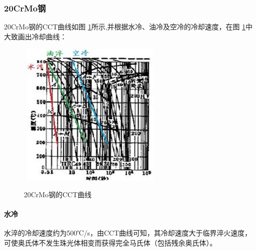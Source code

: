 \documentclass[12pt]{ctexart}
\begin{document}
\subsubsection{20CrMo钢}
20CrMo钢的CCT曲线如图 \ref{cct20}所示,并根据水冷、油冷及空冷的冷却速度，在图 \ref{cct20}中大致画出冷却曲线：
\begin{figure}[h]
  \centering
  \includegraphics[width=7cm,height=7cm]{cct20.jpg}\\
  \caption{20CrMo钢的CCT曲线}\label{cct20}
\end{figure}
\paragraph{水冷}
水淬的冷却速度约为500℃/s，由CCT曲线可知，其冷却速度大于临界淬火速度，可使奥氏体不发生珠光体相变而获得完全马氏体（包括残余奥氏体）。
\end{document}
